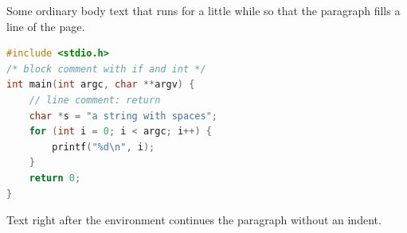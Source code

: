 \documentclass{article}
\begin{document}
Some ordinary body text that runs for a little while so that the paragraph fills a line of the page.
\begin{lstlisting}[language=C,basicstyle=\ttfamily]
#include <stdio.h>
/* block comment with if and int */
int main(int argc, char **argv) {
    // line comment: return
    char *s = "a string with spaces";
    for (int i = 0; i < argc; i++) {
        printf("%d\n", i);
    }
    return 0;
}
\end{lstlisting}
Text right after the environment continues the paragraph without an indent.
\end{document}
